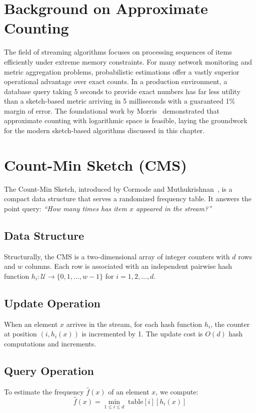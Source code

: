 \section{Background on Approximate Counting}

The field of streaming algorithms focuses on processing sequences of items efficiently under extreme memory constraints. For many network monitoring and metric aggregation problems, probabilistic estimations offer a vastly superior operational advantage over exact counts. In a production environment, a database query taking 5 seconds to provide exact numbers has far less utility than a sketch-based metric arriving in 5 milliseconds with a guaranteed 1\% margin of error. The foundational work by Morris~\cite{morris1978counting} demonstrated that approximate counting with logarithmic space is feasible, laying the groundwork for the modern sketch-based algorithms discussed in this chapter.

\section{Count-Min Sketch (CMS)}

The Count-Min Sketch, introduced by Cormode and Muthukrishnan~\cite{cms}, is a compact data structure that serves a randomized frequency table. It answers the point query: \textit{``How many times has item $x$ appeared in the stream?''}

\subsection{Data Structure}
Structurally, the CMS is a two-dimensional array of integer counters with $d$ rows and $w$ columns. Each row is associated with an independent pairwise hash function $h_i : \mathcal{U} \rightarrow \{0, 1, \ldots, w-1\}$ for $i = 1, 2, \ldots, d$.

\subsection{Update Operation}
When an element $x$ arrives in the stream, for each hash function $h_i$, the counter at position $(i, h_i(x))$ is incremented by 1. The update cost is $O(d)$ hash computations and increments.

\subsection{Query Operation}
To estimate the frequency $\hat{f}(x)$ of an element $x$, we compute:
\begin{equation}
    \hat{f}(x) = \min_{1 \le i \le d} \; \text{table}[i][h_i(x)]
\end{equation}

